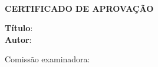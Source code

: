 %
%

\begin{folhadeaprovacao}
	\begin{center}
	\cabecalhoCapa \\
	\textbf{CERTIFICADO DE APROVAÇÃO}
	 \\    
   \end{center}
	\begin{flushleft}   
	\hspace{1cm}\large\textbf{Título}: \imprimirtitulo
     \\
   	\hspace{1cm}\large\textbf{Autor}: \imprimirautor
	\end{flushleft} 
		
	\begin{center}
	\ImprimirDataDefesa
	\end{center}
    \begin{flushleft}
	\large Comissão examinadora: 
	\end{flushleft}
	\assinatura{\imprimirPrimeiroMembroBanca} 
    \assinatura{\imprimirSegundoMembroBanca}


	
	\begin{center}
		\vspace*{0.5cm}
		{\large\imprimirlocal}
		\par
		\vspace*{1cm}
	\end{center}	
\end{folhadeaprovacao}